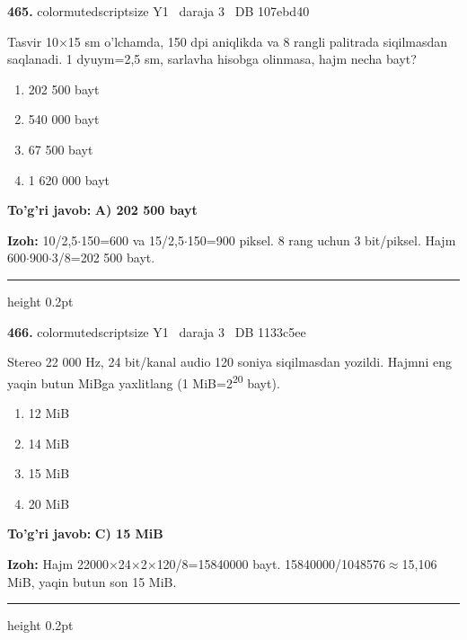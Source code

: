 \documentclass[10pt,a4paper,oneside]{article}
\begin{document}
\noindent\textbf{\color{ink}465.}  {color{muted}scriptsize Y1 \textbullet\ daraja 3 \textbullet\ DB 107ebd40}
\par
Tasvir 10\ensuremath{\times}15 sm o'lchamda, 150 dpi aniqlikda va 8 rangli palitrada siqilmasdan saqlanadi. 1 dyuym=2,5 sm, sarlavha hisobga olinmasa, hajm necha bayt?
\begin{enumerate}[label=\Alph*),leftmargin=9mm]
\item 202 500 bayt
\item 540 000 bayt
\item 67 500 bayt
\item 1 620 000 bayt
\end{enumerate}
\begin{tcolorbox}[enhanced,breakable,colback=teal!4,colframe=teal!50!black,boxrule=0.5pt,arc=1.1mm,left=3mm,right=3mm,top=1.7mm,bottom=1.7mm,before skip=2mm,after skip=2mm]
\textbf{\color{teal}To'g'ri javob:} \textbf{A) 202 500 bayt}
\par\smallskip
\textbf{Izoh:} 10/2,5\ensuremath{\cdot}150=600 va 15/2,5\ensuremath{\cdot}150=900 piksel. 8 rang uchun 3 bit/piksel. Hajm 600\ensuremath{\cdot}900\ensuremath{\cdot}3/8=202 500 bayt.
\end{tcolorbox}
\vspace{2mm}\hrule height 0.2pt \vspace{3mm}

\noindent\textbf{\color{ink}466.}  {color{muted}scriptsize Y1 \textbullet\ daraja 3 \textbullet\ DB 1133c5ee}
\par
Stereo 22 000 Hz, 24 bit/kanal audio 120 soniya siqilmasdan yozildi. Hajmni eng yaqin butun MiBga yaxlitlang (1 MiB=2\textsuperscript{2}\textsuperscript{0} bayt).
\begin{enumerate}[label=\Alph*),leftmargin=9mm]
\item 12 MiB
\item 14 MiB
\item 15 MiB
\item 20 MiB
\end{enumerate}
\begin{tcolorbox}[enhanced,breakable,colback=teal!4,colframe=teal!50!black,boxrule=0.5pt,arc=1.1mm,left=3mm,right=3mm,top=1.7mm,bottom=1.7mm,before skip=2mm,after skip=2mm]
\textbf{\color{teal}To'g'ri javob:} \textbf{C) 15 MiB}
\par\smallskip
\textbf{Izoh:} Hajm 22000\ensuremath{\times}24\ensuremath{\times}2\ensuremath{\times}120/8=15840000 bayt. 15840000/1048576\ensuremath{\approx}15,106 MiB, yaqin butun son 15 MiB.
\end{tcolorbox}
\vspace{2mm}\hrule height 0.2pt \vspace{3mm}
\end{document}
